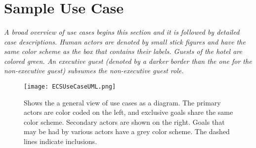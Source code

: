 \documentclass[12pt]{article}
\begin{document}
\section{Sample Use Case} \label{samp}
\paragraph{} \textit{A broad overview of use cases begins this section and it is followed by detailed case descriptions. Human actors
are denoted by small stick figures and have the same color scheme as the box that contains their labels. Guests of the hotel are colored 
green. An executive guest (denoted by a darker border than the one for the non-executive guest) subsumes the non-executive guest role.}
\begin{figure}[H]
	\centerline{\texttt{[image: ECSUseCaseUML.png]}}
	\caption{Shows the a general view of use cases as a diagram. The primary actors are color coded on the left, and exclusive
	goals share the same color scheme. Secondary actors are shown on the right. Goals that may be had by various actors have a 
	grey color scheme. The dashed lines indicate inclusions.}
	\label{fig:usecasediagram}
\end{figure}
	\pagebreak
\end{document}
